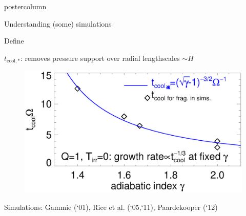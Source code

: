 \documentclass[final,hyperref={pdfpagelabels=false}]{beamer}
\begin{document}
\begin{frame}
\begin{columns}
\begin{column}{.49\textwidth}
\begin{beamercolorbox}[center,wd=\textwidth]{postercolumn}
\begin{minipage}[T]{.95\textwidth}
{            \begin{block}{{\Large Understanding (some) simulations}}
              \justifying
              \vspace{-.5cm}
              \begin{center}
              Define \begin{onlinebox}{23cm} $t_\mathrm{cool,*}$:
                  removes pressure support over
                  radial lengthscales 
                  $\sim H$\end{onlinebox}
              \end{center}
              \vspace{-.5cm}
              \begin{figure}
                \includegraphics[width=\linewidth,clip=true,trim=0cm 0cm 0cm 1.1cm]{figures/tcool}
              \end{figure}
              \vspace{-1cm}
              {\small Simulations: Gammie (`01), Rice et al. (`05,`11),
                Paardekooper (`12)}
            \end{block}
            
}
\end{minipage}
\end{beamercolorbox}
\end{column}
\end{columns}
\end{frame}
\end{document}
